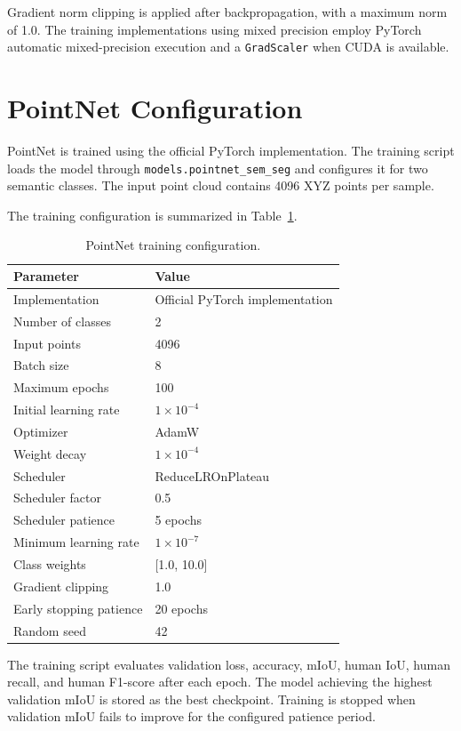 Gradient norm clipping is applied after backpropagation, with a maximum norm of 1.0. The training implementations using mixed precision employ PyTorch automatic mixed-precision execution and a \texttt{GradScaler} when CUDA is available.

\section{PointNet Configuration}
\label{app:pointnet_configuration}

PointNet is trained using the official PyTorch implementation. The training script loads the model through \texttt{models.pointnet\_sem\_seg} and configures it for two semantic classes. The input point cloud contains 4096 XYZ points per sample.

The training configuration is summarized in Table~\ref{tab:app_pointnet_config}.

\begin{table}[H]
\centering
\caption{PointNet training configuration.}
\label{tab:app_pointnet_config}
\begin{tabular}{|l|l|}
\hline
\textbf{Parameter} & \textbf{Value} \\
\hline
Implementation & Official PyTorch implementation \\
Number of classes & 2 \\
Input points & 4096 \\
Batch size & 8 \\
Maximum epochs & 100 \\
Initial learning rate & $1\times10^{-4}$ \\
Optimizer & AdamW \\
Weight decay & $1\times10^{-4}$ \\
Scheduler & ReduceLROnPlateau \\
Scheduler factor & 0.5 \\
Scheduler patience & 5 epochs \\
Minimum learning rate & $1\times10^{-7}$ \\
Class weights & [1.0, 10.0] \\
Gradient clipping & 1.0 \\
Early stopping patience & 20 epochs \\
Random seed & 42 \\
\hline
\end{tabular}
\end{table}

The training script evaluates validation loss, accuracy, mIoU, human IoU, human recall, and human F1-score after each epoch. The model achieving the highest validation mIoU is stored as the best checkpoint. Training is stopped when validation mIoU fails to improve for the configured patience period.

